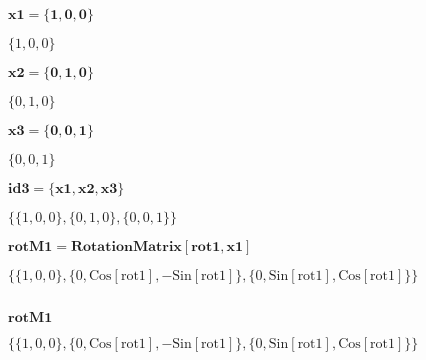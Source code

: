 \documentclass{article}
\begin{document}
\begin{doublespace}
\noindent\(\pmb{\text{x1}=\{1,0,0\}}\)
\end{doublespace}

\begin{doublespace}
\noindent\(\{1,0,0\}\)
\end{doublespace}

\begin{doublespace}
\noindent\(\pmb{\text{x2}=\{0,1,0\}}\)
\end{doublespace}

\begin{doublespace}
\noindent\(\{0,1,0\}\)
\end{doublespace}

\begin{doublespace}
\noindent\(\pmb{\text{x3}=\{0,0,1\}}\)
\end{doublespace}

\begin{doublespace}
\noindent\(\{0,0,1\}\)
\end{doublespace}

\begin{doublespace}
\noindent\(\pmb{\text{id3}=\{\text{x1},\text{x2},\text{x3}\}}\)
\end{doublespace}

\begin{doublespace}
\noindent\(\{\{1,0,0\},\{0,1,0\},\{0,0,1\}\}\)
\end{doublespace}

\begin{doublespace}
\noindent\(\pmb{\text{rotM1}=\text{RotationMatrix}[\text{rot1},\text{x1}]}\)
\end{doublespace}

\begin{doublespace}
\noindent\(\{\{1,0,0\},\{0,\text{Cos}[\text{rot1}],-\text{Sin}[\text{rot1}]\},\{0,\text{Sin}[\text{rot1}],\text{Cos}[\text{rot1}]\}\}\)
\end{doublespace}

\begin{doublespace}
\noindent\(\pmb{\text{}}\)
\end{doublespace}

\begin{doublespace}
\noindent\(\pmb{\text{rotM1}}\)
\end{doublespace}

\begin{doublespace}
\noindent\(\{\{1,0,0\},\{0,\text{Cos}[\text{rot1}],-\text{Sin}[\text{rot1}]\},\{0,\text{Sin}[\text{rot1}],\text{Cos}[\text{rot1}]\}\}\)
\end{doublespace}
\end{document}

